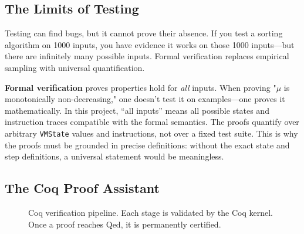 \subsection{The Limits of Testing}

Testing can find bugs, but it cannot prove their absence. If you test a sorting algorithm on 1000 inputs, you have evidence it works on those 1000 inputs---but there are infinitely many possible inputs. Formal verification replaces empirical sampling with universal quantification.

\textbf{Formal verification} proves properties hold for \textit{all} inputs. When proving "$\mu$ is monotonically non-decreasing," one doesn't test it on examples---one proves it mathematically.
In this project, “all inputs” means all possible states and instruction traces compatible with the formal semantics. The proofs quantify over arbitrary \texttt{VMState} values and instructions, not over a fixed test suite. This is why the proofs must be grounded in precise definitions: without the exact state and step definitions, a universal statement would be meaningless.

\subsection{The Coq Proof Assistant}


\begin{figure}[H]
\centering
{}
\caption{Coq verification pipeline. Each stage is validated by the Coq kernel. Once a proof reaches Qed, it is permanently certified.}
\label{fig:coq-pipeline}
\end{figure}

